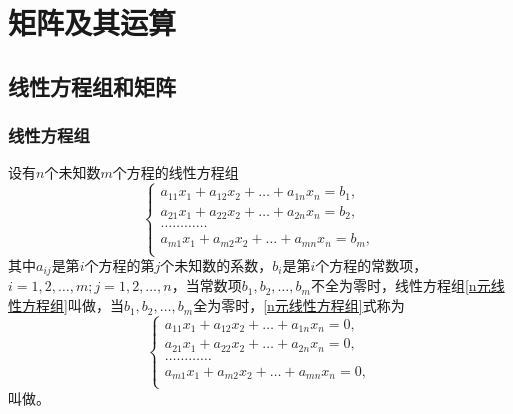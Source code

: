 \chapter{矩阵及其运算}

\section{线性方程组和矩阵}

\subsection{线性方程组}

\begin{定义}
	设有$ n $个未知数$ m $个方程的线性方程组
	\begin{equation} \label{n元线性方程组}
		\left\{
		\begin{array}{l}
			a_{11}x_{1} + a_{12}x_{2} + \dots + a_{1n}x_{n}= b_{1}, \\
			a_{21}x_{1} + a_{22}x_{2} + \dots + a_{2n}x_{n}= b_{2}, \\
			\dots \dots \dots \dots\\
			a_{m1}x_{1} + a_{m2}x_{2} + \dots + a_{mn}x_{n}= b_{m}, \\
		\end{array} \right.
	\end{equation}
	其中$ a_{ij} $是第$ i $个方程的第$ j $个未知数的系数，$ b_{i} $是第$ i $个方程的常数项，$ i=1,2,\dots,m;j=1,2,\dots,n $，当常数项$ b_{1},b_{2},\dots,b_{m} $不全为零时，线性方程组\ref{n元线性方程组}叫做，当$ b_{1},b_{2},\dots,b_{m} $全为零时，\ref{n元线性方程组}式称为
	\begin{equation} \label{n元齐次线性方程组}
		\left\{
		\begin{array}{l}
			a_{11}x_{1} + a_{12}x_{2} + \dots + a_{1n}x_{n}= 0, \\
			a_{21}x_{1} + a_{22}x_{2} + \dots + a_{2n}x_{n}= 0, \\
			\dots \dots \dots \dots\\
			a_{m1}x_{1} + a_{m2}x_{2} + \dots + a_{mn}x_{n}= 0, \\
		\end{array} \right.
	\end{equation}
	叫做。
\end{定义}
